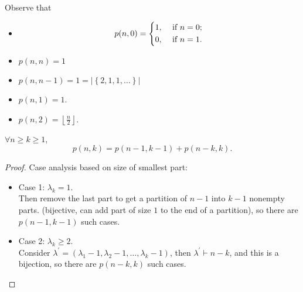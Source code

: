 Observe that 
\begin{itemize}
    \item
    \[
        p(n, 0) = \begin{dcases}
            1, &\text{ if } n=0 ;\\
            0, &\text{ if } n=1.
        \end{dcases}
    \]
    \item \(p(n, n) = 1\) 
    \item \(p(n, n-1) = 1  = \vert \left\{ 2,1,1,\dots  \right\}  \vert \)  
    \item \(p(n, 1) = 1\). 
    \item \(p(n, 2) = \left\lfloor \frac{n}{2} \right\rfloor\).  
\end{itemize}

\begin{proposition}
    \(\forall n \ge k \ge 1\),
    \[
        p(n, k) = p(n - 1, k - 1) + p(n - k, k).
    \] 
\end{proposition}
\begin{proof}
    Case analysis based on size of smallest part: 
    \begin{itemize}
        \item Case 1: \(\lambda _k = 1\). \\
        Then remove the last part to get a partition of \(n-1\) into \(k-1\) nonempty parts. (bijective, can add part of size \(1\) to the end of a partition), so there are \(p(n-1, k-1)\) such cases.  
        \item Case 2: \(\lambda _k \ge 2\). \\
        Consider \(\lambda ^{\prime} = (\lambda _1 -1, \lambda _2 - 1, \dots , \lambda _k - 1)\), then \(\lambda ^{\prime}  \vdash n - k\), and this is a bijection, so there are \(p(n-k, k)\) such cases.  
    \end{itemize}
\end{proof}
